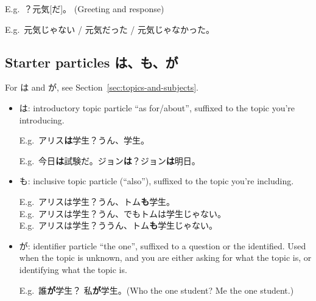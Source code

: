 \documentclass[../nihongo-gakushuu-kyouzai.tex]{subfiles}
\begin{document}
E.g.\ ？元気[だ]。 (Greeting and response)

E.g.\ 元気じゃない / 元気だった / 元気じゃなかった。

\subsection{Starter particles は、も、が} \label{sec:particles}
For は and が, see Section~\ref{sec:topics-and-subjects}.
\begin{itemize}
    \item は: introductory topic particle ``as for/about'', suffixed to the topic you're introducing.

    E.g.\ アリス\textbf{は}学生？うん、学生。

    E.g.\ 今日\textbf{は}試験だ。ジョン\textbf{は}？ジョン\textbf{は}明日。
    \item も: inclusive topic particle (``also''), suffixed to the topic you're including.

    E.g.\ アリスは学生？うん、トム\textbf{も}学生。\\
    E.g.\ アリスは学生？うん、でもトムは学生じゃない。\\
    E.g.\ アリスは学生？ううん、トム\textbf{も}学生じゃない。
    \item が: identifier particle ``the one'', suffixed to a question or the identified. Used when the topic is unknown, and you are either asking for what the topic is, or identifying what the topic is.

    E.g.\ 誰\textbf{が}学生？ 私\textbf{が}学生。(Who the one student? Me the one student.)\\
\end{itemize}
\end{document}
